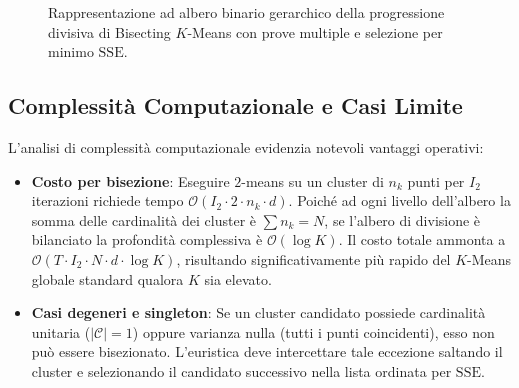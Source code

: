 \begin{figure}[H]
{%
}
\caption{Rappresentazione ad albero binario gerarchico della progressione divisiva di Bisecting $K$-Means con prove multiple e selezione per minimo $\mathrm{SSE}$.}
\label{fig:dm-bisecting-kmeans-tree}
\end{figure}


\FloatBarrier
\subsection{Complessità Computazionale e Casi Limite}

L'analisi di complessità computazionale evidenzia notevoli vantaggi operativi:
\begin{itemize}
    \item \textbf{Costo per bisezione}: Eseguire $2$-means su un cluster di $n_k$ punti per $I_2$ iterazioni richiede tempo $\mathcal{O}(I_2 \cdot 2 \cdot n_k \cdot d)$. Poiché ad ogni livello dell'albero la somma delle cardinalità dei cluster è $\sum n_k = N$, se l'albero di divisione è bilanciato la profondità complessiva è $\mathcal{O}(\log K)$. Il costo totale ammonta a $\mathcal{O}(T \cdot I_2 \cdot N \cdot d \cdot \log K)$, risultando significativamente più rapido del $K$-Means globale standard qualora $K$ sia elevato.
    \item \textbf{Casi degeneri e singleton}: Se un cluster candidato possiede cardinalità unitaria ($|\mathcal{C}| = 1$) oppure varianza nulla (tutti i punti coincidenti), esso non può essere bisezionato. L'euristica deve intercettare tale eccezione saltando il cluster e selezionando il candidato successivo nella lista ordinata per $\mathrm{SSE}$.
\end{itemize}

